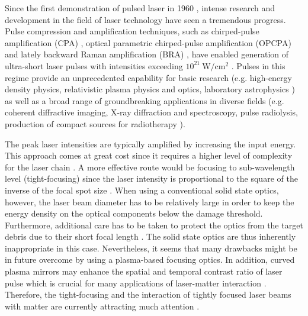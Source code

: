 Since the first demonstration of pulsed laser in 1960 \cite{Maiman1960}, intense research and development in the field of laser technology have seen a tremendous progress. Pulse compression and amplification techniques, such as chirped-pulse amplification (CPA) \cite{StricklandMourou1985}, optical parametric chirped-pulse amplification (OPCPA) \cite{Dubietis1992} and lately backward Raman amplification (BRA) \cite{Malkin1999}, have enabled generation of ultra-short laser pulses with intensities exceeding $ 10^{21} \ \mathrm{W/cm^{2}} $ \cite{Danson2015}. Pulses in this regime provide an unprecedented capability for basic research (e.g. high-energy density physics, relativistic plasma physics and optics, laboratory astrophysics \cite{Council2003, Graziani2014, Lebedev2007, Bridgman1958, Krehl2008, Andreev2006, Weber2013, Bulanov2015, Zakharov2003}) as well as a broad range of groundbreaking applications in diverse fields (e.g. coherent diffractive imaging, X-ray diffraction and spectroscopy, pulse radiolysis, production of compact sources for radiotherapy \cite{Zewail2010, Bulanov2004, Malka2004}).

The peak laser intensities are typically amplified by increasing the input energy. This approach comes at great cost since it requires a higher level of complexity for the laser chain \cite{Fuchs2014}. A more effective route would be focusing to sub-wavelength level (tight-focusing) since the laser intensity is proportional to the square of the inverse of the focal spot size \cite{Kon2010}. When using a conventional solid state optics, however, the laser beam diameter has to be relatively large in order to keep the energy density on the optical components below the damage threshold. Furthermore, additional care has to be taken to protect the optics from the target debris due to their short focal length \cite{Liu2011}. The solid state optics are thus inherently inappropriate in this case. Nevertheless, it seems that many drawbacks might be in future overcome by using a plasma-based focusing optics. In addition, curved plasma mirrors may enhance the spatial and temporal contrast ratio of laser pulse which is crucial for many applications of laser-matter interaction \cite{Fuchs2014}. Therefore, the tight-focusing and the interaction of tightly focused laser beams with matter are currently attracting much attention \cite{Popov2008, Popov2009, Lifschitz2016, Yan2005}. 

